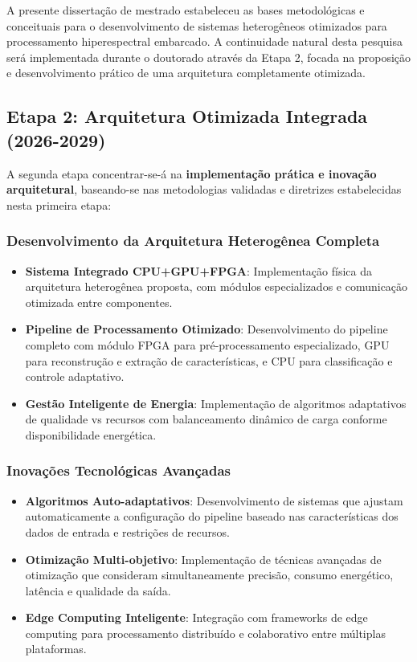 A presente dissertação de mestrado estabeleceu as bases metodológicas e conceituais para o desenvolvimento de sistemas heterogêneos otimizados para processamento hiperespectral embarcado. A continuidade natural desta pesquisa será implementada durante o doutorado através da Etapa 2, focada na proposição e desenvolvimento prático de uma arquitetura completamente otimizada.

\subsection{Etapa 2: Arquitetura Otimizada Integrada (2026-2029)}

A segunda etapa concentrar-se-á na \textbf{implementação prática e inovação arquitetural}, baseando-se nas metodologias validadas e diretrizes estabelecidas nesta primeira etapa:

\subsubsection{Desenvolvimento da Arquitetura Heterogênea Completa}

\begin{itemize}
\item \textbf{Sistema Integrado CPU+GPU+FPGA}: Implementação física da arquitetura heterogênea proposta, com módulos especializados e comunicação otimizada entre componentes.

\item \textbf{Pipeline de Processamento Otimizado}: Desenvolvimento do pipeline completo com módulo FPGA para pré-processamento especializado, GPU para reconstrução e extração de características, e CPU para classificação e controle adaptativo.

\item \textbf{Gestão Inteligente de Energia}: Implementação de algoritmos adaptativos de qualidade vs recursos com balanceamento dinâmico de carga conforme disponibilidade energética.
\end{itemize}

\subsubsection{Inovações Tecnológicas Avançadas}

\begin{itemize}
\item \textbf{Algoritmos Auto-adaptativos}: Desenvolvimento de sistemas que ajustam automaticamente a configuração do pipeline baseado nas características dos dados de entrada e restrições de recursos.

\item \textbf{Otimização Multi-objetivo}: Implementação de técnicas avançadas de otimização que consideram simultaneamente precisão, consumo energético, latência e qualidade da saída.

\item \textbf{Edge Computing Inteligente}: Integração com frameworks de edge computing para processamento distribuído e colaborativo entre múltiplas plataformas.
\end{itemize}

